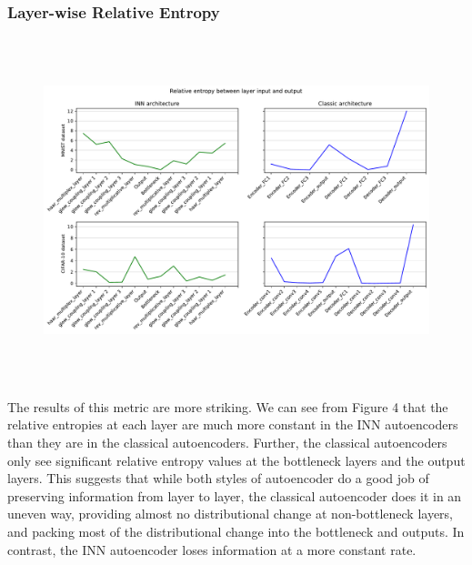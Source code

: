 \documentclass[11pt,letterpaper]{article}
\begin{document}
     \subsubsection{Layer-wise Relative Entropy}
     \begin{figure}[!htb]
     \begin{center}
        \caption{}
        \includegraphics[height=10cm]{./pics/relative_entropies.pdf}
     \end{center}
     \end{figure}
      The results of this metric are more striking. We can see from Figure 4 that the relative entropies at each layer are much more constant in the INN autoencoders than they are in the classical autoencoders. Further, the classical autoencoders only see significant relative entropy values at the bottleneck layers and the output layers. This suggests that while both styles of autoencoder do a good job of preserving information from layer to layer, the classical autoencoder does it in an uneven way, providing almost no distributional change at non-bottleneck layers, and packing most of the distributional change into the bottleneck and outputs. In contrast, the INN autoencoder loses information at a more constant rate.
\end{document}
